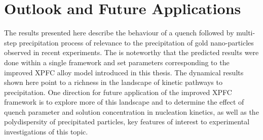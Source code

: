 \section{Outlook and Future Applications} %


The results presented here describe the behaviour of a quench followed by
multi-step precipitation process of relevance to the precipitation of gold
nano-particles observed in recent experiments. The is noteworthy that the
predicted results were done within a single framework and set parameters
corresponding to the improved XPFC alloy model introduced in this thesis. The
dynamical results shown here point to a richness in the landscape of kinetic
pathways to precipitation. One direction for future application of the improved
XPFC framework is to explore more of this landscape and to determine the effect
of quench parameter and solution concentration in nucleation kinetics, as well
as the polydispersity of precipitated particles, key features of interest to
experimental investigations of this topic.

